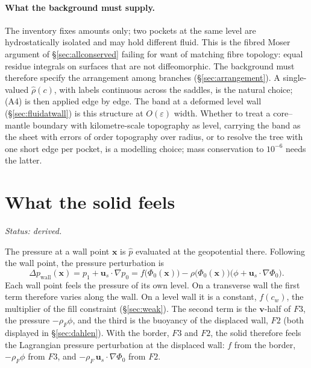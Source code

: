 \documentclass[11pt]{article}
\theoremstyle{definition}
\theoremstyle{remark}
\newcommand{\bu}{\mathbf{u}}
\newcommand{\bv}{\mathbf{v}}
\newcommand{\bx}{\mathbf{x}}
\newcommand{\status}[1]{\noindent\emph{Status: #1}\par\smallskip}
\begin{document}
\paragraph{What the background must supply.} The inventory fixes
amounts only; two pockets at the same level are hydrostatically
isolated and may hold different fluid. This is the fibred Moser
argument of \S\ref{sec:allconserved} failing for want of matching fibre
topology: equal residue integrals on surfaces that are not
diffeomorphic. The background must therefore specify the arrangement
among branches (\S\ref{sec:arrangement}). A single-valued
$\hat\rho(c)$, with labels continuous across the saddles, is the
natural choice;
(A4) is then applied edge by edge. The band at a deformed level wall
(\S\ref{sec:fluidatwall}) is this structure at $O(\varepsilon)$ width.
Whether to treat a core--mantle boundary with kilometre-scale
topography as level, carrying the band as the sheet with errors of
order topography over radius, or to resolve the tree with one short
edge per pocket, is a modelling choice; mass conservation to $10^{-6}$
needs the latter.

\section{What the solid feels}
\label{sec:feels}

\status{derived.}

The pressure at a wall point $\bx$ is $\hat p$ evaluated at the
geopotential there. Following the wall point, the pressure perturbation
is
\begin{equation}
  \Delta p_{\mathrm{wall}}(\bx) = p_1 + \bu_s\cdot\nabla p_0
  = f\bigl(\Phi_0(\bx)\bigr)
  - \rho\bigl(\Phi_0(\bx)\bigr)\bigl(\phi + \bu_s\cdot\nabla\Phi_0\bigr) .
  \label{eq:wallp}
\end{equation}
Each wall point feels the pressure of its own level. On a transverse
wall the first term therefore varies along the wall. On a level wall it
is a constant, $f(c_w)$, the multiplier of the fill constraint
(\S\ref{sec:weak}). The second term is the $\bv$-half of $F3$, the
pressure $-\rho_F\phi$, and the third is the buoyancy of the displaced
wall, $F2$ (both displayed in \S\ref{sec:dahlen}). With the border,
$F3$ and $F2$, the solid therefore feels the Lagrangian pressure
perturbation at the displaced wall: $f$ from the border, $-\rho_F\phi$
from $F3$, and $-\rho_F\,\bu_s\cdot\nabla\Phi_0$ from $F2$.
\end{document}
